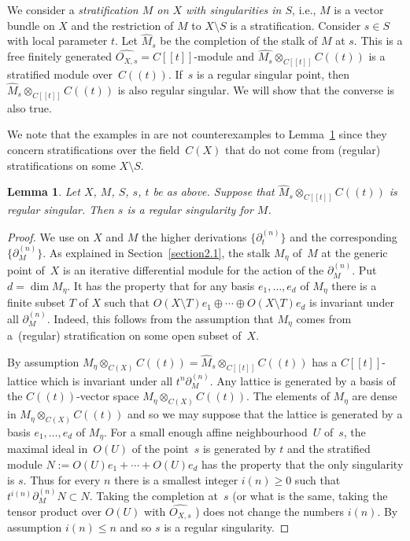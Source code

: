 \documentclass[pdftex]{sigma}
\numberwithin{equation}{section}
\newtheorem{Lemma}[Theorem]{Lemma}
\begin{document}
We consider a {\it stratification $M$ on $X$ with singularities in $S$}, i.e., $M$ is a vector bundle on $X$ and the restriction of $M$ to $X\setminus S$ is a stratification. Consider $s\in S$ with local parameter $t$. Let $\widehat{M}_s$ be the completion of the stalk of $M$ at $s$. This is a free finitely generated $\widehat{O_{X,s}}=C[[t]]$-module and $\widehat{M_s}\otimes _{C[[t]]}C((t))$ is a stratified module over~$C((t))$. If~$s$ is a regular singular point, then $\widehat{M}_s\otimes_{C[[t]]} C((t))$ is also regular singular. We will show that the converse is also true.

We note that the examples in \cite[Sections~4.2 and~7]{Ma-vdP1} are not counterexamples to Lemma~\ref{3.1} since they concern stratifications over the field~$C(X)$ that do not come from (regular) stratifications on some $X\setminus S$.

\begin{Lemma}\label{3.1} Let $X$, $M$, $S$, $s$, $t$ be as above. Suppose that $\widehat{M}_s\otimes _{C[[t]]}C((t))$ is regular singular. Then $s$ is a regular singularity for $M$.
 \end{Lemma}
\begin{proof} We use on $X$ and $M$ the higher derivations $\big\{\partial_t^{(n)}\big\}$ and the corresponding $\big\{\partial_M^{(n)}\big\}$. As explained in Section~\ref{section2.1}, the stalk $M_\eta$ of~$M$ at the generic point of~$X$ is an iterative differential module for the action of the $\partial_M^{(n)}$. Put $d=\dim M_\eta$. It has the property that for any basis $e_1,\dots ,e_d$ of $M_\eta$ there is a finite subset $T$ of $X$ such that $O(X\setminus T)e_1\oplus \cdots \oplus O(X\setminus T)e_d$ is invariant under all $\partial_M^{(n)}$. Indeed, this follows from the assumption that $M_\eta$ comes from a~(regular) stratification on some open subset of~$X$.

By assumption $M_\eta\otimes _{C(X)}C((t))=\widehat{M}_s\otimes _{C[[t]]}C((t))$ has a $C[[t]]$-lattice which is invariant under all $t^n\partial_M^{(n)}$. Any lattice is generated by a basis of the $C((t))$-vector space $M_\eta\otimes _{C(X)}C((t))$. The elements of $M_\eta$ are dense in $M_\eta\otimes _{C(X)}C((t))$ and so we may suppose that the lattice is generated by a basis $e_1,\dots ,e_d$ of $M_\eta$. For a small enough affine neighbourhood~$U$ of~$s$, the maximal ideal in~$O(U)$ of the point~$s$ is generated by $t$ and the stratified module $N:=O(U)e_1+\cdots +O(U)e_d$ has the property that the only singularity is $s$. Thus for every $n$ there is a smallest integer $i(n)\geq 0$ such that $t^{i(n)}\partial _M^{(n)}N\subset N$. Taking the completion at~$s$ (or what is the same, taking the tensor product over $O(U)$ with $\widehat{O_{X,s}}$ ) does not change the numbers $i(n)$. By assumption $i(n)\leq n$ and so $s$ is a regular singularity. \end{proof}
\end{document}
